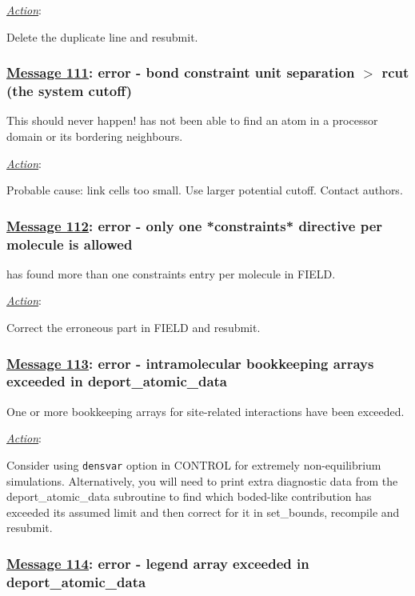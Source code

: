 \noindent \underline{\em Action}:

Delete the duplicate line and resubmit.

\subsubsection*{\underline{Message 111}: error - bond constraint unit separation $>$ rcut (the system cutoff)}

This should never happen!  \D has not been able to find an atom in
a processor domain or its bordering neighbours.

\noindent \underline{\em Action}:

Probable cause: link cells too small. Use larger potential cutoff.
Contact \D authors.

\subsubsection*{\underline{Message 112}: error - only one *constraints* directive per molecule is allowed}

\D has found more than one constraints entry per molecule in FIELD.

\noindent \underline{\em Action}:

Correct the erroneous part in FIELD and resubmit.

\subsubsection*{\underline{Message 113}: error - intramolecular bookkeeping arrays exceeded in deport\_atomic\_data}

One or more bookkeeping arrays for site-related interactions have
been exceeded.

\noindent \underline{\em Action}:

Consider using {\tt densvar} option in CONTROL for extremely
non-equilibrium simulations.  Alternatively, you will need to
print extra diagnostic data from the {\sc deport\_atomic\_data}
subroutine to find which boded-like contribution has exceeded
its assumed limit and then correct for it in {\sc set\_bounds},
recompile and resubmit.

\subsubsection*{\underline{Message 114}: error - legend array exceeded in deport\_atomic\_data}

